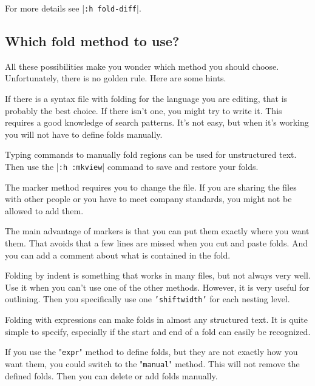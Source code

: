 For more details see |\texttt{:h fold-diff}|.
\subsection{Which fold method to use?}
All these possibilities make you wonder which method you should choose.
Unfortunately, there is no golden rule.
Here are some hints.

If there is a syntax file with folding for the language you are editing, that is probably the best choice.
If there isn't one, you might try to write it.
This requires a good knowledge of search patterns.
It's not easy, but when it's working you will not have to define folds manually.

Typing commands to manually fold regions can be used for unstructured text.
Then use the |\texttt{:h :mkview}| command to save and restore your folds.

The marker method requires you to change the file.
If you are sharing the files with other people or you have to meet company standards, you might not be allowed to add them.

The main advantage of markers is that you can put them exactly where you want them.
That avoids that a few lines are missed when you cut and paste folds.
And you can add a comment about what is contained in the fold.

Folding by indent is something that works in many files, but not always very well.
Use it when you can't use one of the other methods.
However, it is very useful for outlining.
Then you specifically use one \texttt{'shiftwidth'} for each nesting level.

Folding with expressions can make folds in almost any structured text.
It is quite simple to specify, especially if the start and end of a fold can easily be recognized.

If you use the "\texttt{expr}" method to define folds, but they are not exactly how you want them, you could switch to the "\texttt{manual}" method.
This will not remove the defined folds.
Then you can delete or add folds manually.
\clearpage
